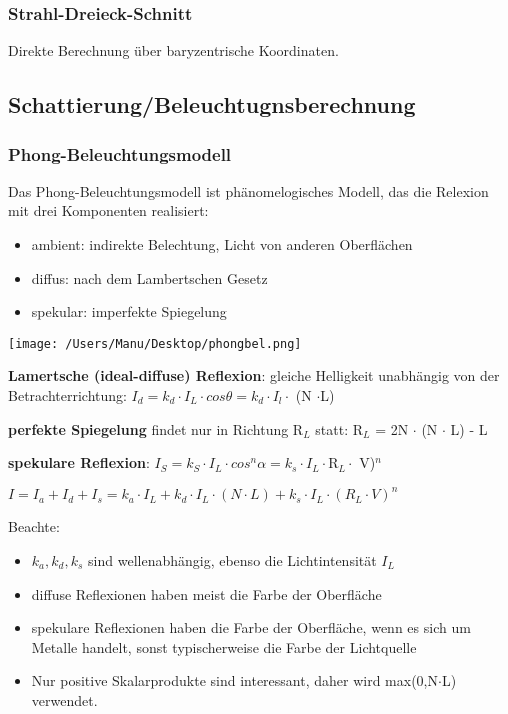 \documentclass[paper=a4, fontsize=11pt]{scrartcl} %
\numberwithin{equation}{section} %
\numberwithin{figure}{section} %
\numberwithin{table}{section} %
\begin{document}
\subsubsection{Strahl-Dreieck-Schnitt}

Direkte Berechnung über baryzentrische Koordinaten.

\subsection{Schattierung/Beleuchtugnsberechnung}

\subsubsection{Phong-Beleuchtungsmodell}

Das Phong-Beleuchtungsmodell ist phänomelogisches Modell, das die Relexion mit drei Komponenten realisiert:
\begin{itemize}
\item ambient: indirekte Belechtung, Licht von anderen Oberflächen
\item diffus: nach dem Lambertschen Gesetz
\item spekular: imperfekte Spiegelung
\end{itemize}

\texttt{[image: /Users/Manu/Desktop/phongbel.png]}

\textbf{Lamertsche (ideal-diffuse) Reflexion}: gleiche Helligkeit unabhängig von der Betrachterrichtung: $I_d = k_d \cdot I_L \cdot cos \theta = k_d \cdot I_l \cdot$ (N $\cdot $L)

\textbf{perfekte Spiegelung} findet nur in Richtung R$_L$ statt: R$_L$ = 2N $\cdot$ (N $\cdot$ L) - L

\textbf{spekulare Reflexion}: $I_S = k_S \cdot I_L \cdot cos^n \alpha = k_s \cdot I_L \cdot $R$_L \cdot $ V)$^n$

$I = I_a + I_d + I_s = k_a \cdot I_L + k_d \cdot I_L \cdot (N \cdot L) + k_s \cdot I_L \cdot (R_L \cdot V)^n$

Beachte:
\begin{itemize}
\item $k_a, k_d, k_s$ sind wellenabhängig, ebenso die Lichtintensität $I_L$
\item diffuse Reflexionen haben meist die Farbe der Oberfläche
\item spekulare Reflexionen haben die Farbe der Oberfläche, wenn es sich um Metalle handelt, sonst typischerweise die Farbe der Lichtquelle
\item Nur positive Skalarprodukte sind interessant, daher wird max(0,N$\cdot$L) verwendet.
\end{itemize}
\newpage
\end{document}
